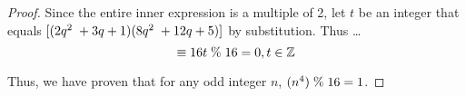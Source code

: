 \documentclass[12pt]{article}
\begin{document}
\begin{proof}
Since the entire inner expression is a multiple of 2, let $t$ be an integer that equals $[(2q^2 \hspace{.1cm} + 3q + 1)(8q^2 \hspace{.1cm} + 12q + 5)]$ by substitution. Thus \ldots \\

\begin{equation}
\equiv 16t \hspace{.1cm} \% \hspace{.1cm} 16 = 0, t \in \mathbb{Z}
\end{equation}
\bigskip

Thus, we have proven that for any odd integer $n$, $(n^4) \hspace{.1cm} \% \hspace{.1cm} 16 = 1$.
\end{proof}
\end{document}
